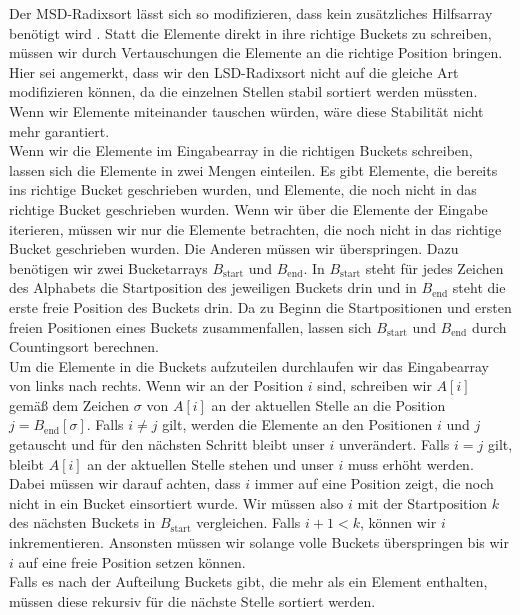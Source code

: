 Der MSD-Radixsort lässt sich so modifizieren, dass kein zusätzliches Hilfsarray benötigt wird \cite{radixsort:inplace}. Statt die Elemente direkt in ihre richtige Buckets zu schreiben, müssen wir durch Vertauschungen die Elemente an die richtige Position bringen. Hier sei angemerkt, dass wir den LSD-Radixsort nicht auf die gleiche Art modifizieren können, da die einzelnen Stellen stabil sortiert werden müssten. Wenn wir Elemente miteinander tauschen würden, wäre diese Stabilität nicht mehr garantiert. \\
Wenn wir die Elemente im Eingabearray in die richtigen Buckets schreiben, lassen sich die Elemente in zwei Mengen einteilen. Es gibt Elemente, die bereits ins richtige Bucket geschrieben wurden, und Elemente, die noch nicht in das richtige Bucket geschrieben wurden. Wenn wir über die Elemente der Eingabe iterieren, müssen wir nur die Elemente betrachten, die noch nicht in das richtige Bucket geschrieben wurden. Die Anderen müssen wir überspringen. Dazu benötigen wir zwei Bucketarrays $B_{\text{start}}$ und $B_{\text{end}}$. In $B_{\text{start}}$ steht für jedes Zeichen des Alphabets die Startposition des jeweiligen Buckets drin und in $B_{\text{end}}$ steht die erste freie Position des Buckets drin. Da zu Beginn die Startpositionen und ersten freien Positionen eines Buckets zusammenfallen, lassen sich $B_{\text{start}}$ und $B_{\text{end}}$ durch Countingsort berechnen. \\
Um die Elemente in die Buckets aufzuteilen durchlaufen wir das Eingabearray von links nach rechts. Wenn wir an der Position $i$ sind, schreiben wir $A[i]$ gemäß dem Zeichen $\sigma$ von $A[i]$ an der aktuellen Stelle an die Position $j = B_{\text{end}}[\sigma]$. Falls $i \ne j$ gilt, werden die Elemente an den Positionen $i$ und $j$ getauscht und für den nächsten Schritt bleibt unser $i$ unverändert. Falls $i = j$ gilt, bleibt $A[i]$ an der aktuellen Stelle stehen und unser $i$ muss erhöht werden. Dabei müssen wir darauf achten, dass $i$ immer auf eine Position zeigt, die noch nicht in ein Bucket einsortiert wurde. Wir müssen also $i$ mit der Startposition $k$ des nächsten Buckets in $B_{\text{start}}$ vergleichen. Falls $i+1 < k$, können wir $i$ inkrementieren. Ansonsten müssen wir solange volle Buckets überspringen bis wir $i$ auf eine freie Position setzen können. \\
Falls es nach der Aufteilung Buckets gibt, die mehr als ein Element enthalten, müssen diese rekursiv für die nächste Stelle sortiert werden. \\


